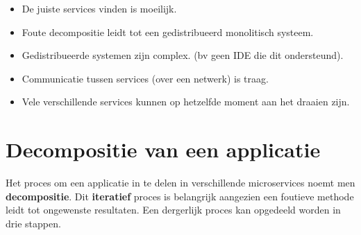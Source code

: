 \documentclass{report}
\begin{document}
\begin{itemize}
\begin{itemize}
\begin{itemize}
			\end{itemize}
			\item[\alert] De juiste services vinden is moeilijk.
			\item[\alert] Foute decompositie leidt tot een gedistribueerd monolitisch systeem.
			\item[\alert] Gedistribueerde systemen zijn complex. (bv geen IDE die dit ondersteund).
			\item[\alert] Communicatie tussen services (over een netwerk) is traag.
			\item[\alert] Vele verschillende services kunnen op hetzelfde moment aan het draaien zijn. 
		\end{itemize}
	\end{itemize}
	
	\chapter{Decompositie van een applicatie}
	Het proces om een applicatie in te delen in verschillende microservices noemt men \textbf{decompositie}. Dit \textbf{iteratief} proces is belangrijk aangezien een foutieve methode leidt tot ongewenste resultaten. Een dergerlijk proces kan opgedeeld worden in drie stappen.
\end{document}
